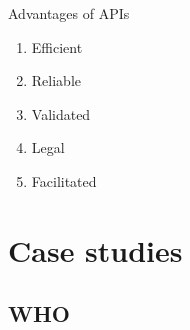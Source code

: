 \documentclass[xcolor=x11names,compress]{beamer}
\renewcommand{\(}{\begin{columns}}
\renewcommand{\)}{\end{columns}}
\newcommand{\<}[1]{\begin{column}{#1}}
\renewcommand{\>}{\end{column}}
\begin{document}
\begin{frame}{Advantages of APIs}
\pause
\begin{enumerate}[<+->]
    \item Efficient
    \item Reliable
    \item Validated
    \item Legal
    \item Facilitated
\end{enumerate}
\end{frame}

\section{Case studies}

\subsection{WHO}
\end{document}

